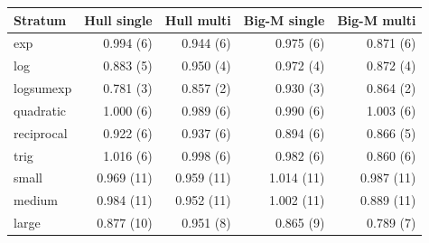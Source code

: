 \begin{tabular}{lrrrr}
\toprule
Stratum & Hull single & Hull multi & Big-M single & Big-M multi \\
\midrule
exp & 0.994 (6) & 0.944 (6) & 0.975 (6) & 0.871 (6) \\
log & 0.883 (5) & 0.950 (4) & 0.972 (4) & 0.872 (4) \\
logsumexp & 0.781 (3) & 0.857 (2) & 0.930 (3) & 0.864 (2) \\
quadratic & 1.000 (6) & 0.989 (6) & 0.990 (6) & 1.003 (6) \\
reciprocal & 0.922 (6) & 0.937 (6) & 0.894 (6) & 0.866 (5) \\
trig & 1.016 (6) & 0.998 (6) & 0.982 (6) & 0.860 (6) \\
small & 0.969 (11) & 0.959 (11) & 1.014 (11) & 0.987 (11) \\
medium & 0.984 (11) & 0.952 (11) & 1.002 (11) & 0.889 (11) \\
large & 0.877 (10) & 0.951 (8) & 0.865 (9) & 0.789 (7) \\
\bottomrule
\end{tabular}
